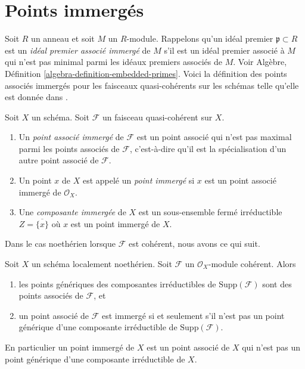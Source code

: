 \section{Points immergés}
\label{section-embedded}

\noindent
Soit  $R$  un anneau et soit  $M$  un  $R$-module. Rappelons
qu'un idéal premier  $\mathfrak p \subset R$  est un  {\it  idéal premier associé
immergé}  de  $M$  s'il est un idéal premier associé à
 $M$  qui n'est pas minimal parmi les idéaux premiers associés de
 $M$. Voir Algèbre, Définition  \ref{algebra-definition-embedded-primes}. Voici la définition des
points associés immergés pour les faisceaux quasi-cohérents sur les schémas telle
qu'elle est donnée dans  \cite[IV définition 3.1.1]{EGA}.

\begin{definition}
\label{definition-embedded}
Soit  $X$  un schéma. Soit  $\mathcal{F}$  un faisceau quasi-cohérent sur
 $X$.
\begin{enumerate}
\item Un  {\it  point associé immergé}  de  $\mathcal{F}$  est
un point associé qui n'est pas maximal parmi les points associés de  $\mathcal{F}$,
c'est-à-dire qu'il est la spécialisation d'un autre point associé de  $\mathcal{F}$.
\item Un point  $x$  de  $X$  est appelé un  {\it  point
immergé}  si  $x$  est un point associé immergé de
 $\mathcal{O}_X$.
\item Une  {\it  composante immergée}  de  $X$  est un
sous-ensemble fermé irréductible  $Z = \overline{\{x\}}$  où  $x$  est un point
immergé de  $X$.
\end{enumerate}
\end{definition}

\noindent
Dans le cas noethérien lorsque  $\mathcal{F}$  est cohérent, nous avons ce qui suit.

\begin{lemma}
\label{lemma-embedded}
Soit  $X$  un schéma localement noethérien. Soit  $\mathcal{F}$  un
 $\mathcal{O}_X$-module cohérent. Alors
\begin{enumerate}
\item les points génériques des composantes irréductibles de  $\text{Supp}(\mathcal{F})$  sont des
points associés de  $\mathcal{F}$, et
\item un point associé de  $\mathcal{F}$  est immergé si et seulement s'il n'est pas un
point générique d'une composante irréductible de  $\text{Supp}(\mathcal{F})$.
\end{enumerate}
En particulier un point immergé de $X$  est un point associé de
 $X$ qui n’est pas un point générique d’une composante irréductible
de $X$.
\end{lemma}

